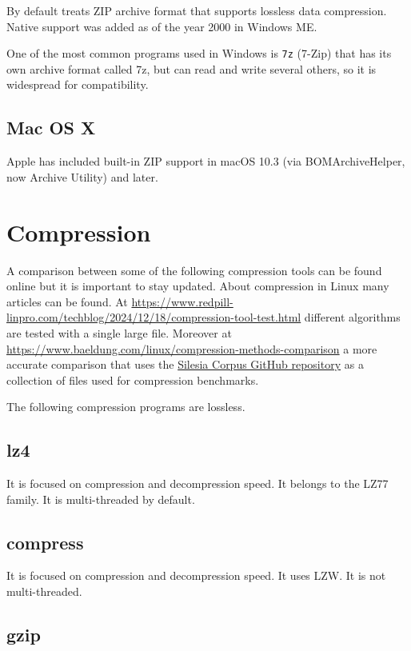 \documentclass[12pt, a4paper]{report}
\begin{document}
By default treats ZIP archive format that supports lossless data compression.
Native support was added as of the year 2000 in Windows ME.

One of the most common programs used in Windows is \texttt{7z} (7-Zip) that has its own archive format called 7z, but can read and
write several others, so it is widespread for compatibility.

\subsection{Mac OS X}

Apple has included built-in ZIP support in macOS 10.3 (via BOMArchiveHelper, now Archive Utility) and later.

\section{Compression}

A comparison between some of the following compression tools can be found online but it is important to stay updated.
About compression in Linux many articles can be found.
At \url{https://www.redpill-linpro.com/techblog/2024/12/18/compression-tool-test.html} different algorithms are tested with a
single large file.
Moreover at \url{https://www.baeldung.com/linux/compression-methods-comparison} a more accurate comparison that uses the
\href{https://github.com/MiloszKrajewski/SilesiaCorpus}{Silesia Corpus GitHub repository} as a collection of files used for
compression benchmarks.

The following compression programs are lossless.

\subsection{lz4}
\label{subsec:lz4}

It is focused on compression and decompression speed.
It belongs to the LZ77 family.
It is multi-threaded by default.

\subsection{compress}
\label{subsec:compress}

It is focused on compression and decompression speed.
It uses LZW.
It is not multi-threaded.

\subsection{gzip}
\label{subsec:gzip}
\end{document}
